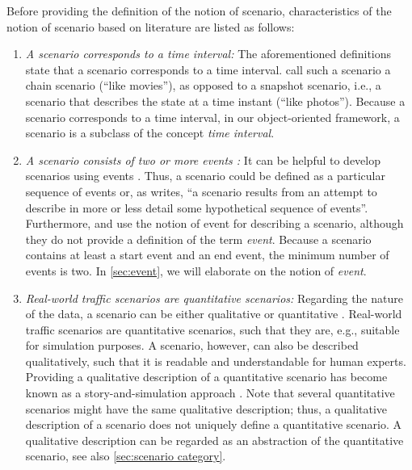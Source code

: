 Before providing the definition of the notion of scenario, characteristics of the notion of scenario based on literature are listed as follows:
%
\begin{enumerate}
	\item \textit{A scenario corresponds to a time interval:}
	The aforementioned definitions \autocite{go2004blind, geyer2014, ulbrich2015, elrofai2016scenario} state that a scenario corresponds to a time interval. \textcite{vannotten2003updated} call such a scenario a chain scenario (``like movies''), as opposed to a snapshot scenario, i.e., a scenario that describes the state at a time instant (``like photos''). %
	\cstartb Because a scenario corresponds to a time interval, in our object-oriented framework, a scenario is a subclass of the concept \emph{time interval}. \cendb

	\item \textit{A scenario consists of \cstartb two or more \cendb events \autocite{vannotten2003updated, go2004blind, geyer2014, ulbrich2015, kahn1962}:}
	It can be helpful to develop scenarios using events \autocite{bishop2007scentechniques}. Thus, a scenario could be defined as a particular sequence of events or, as \textcite[p.~143]{kahn1962} writes, ``a scenario results from an attempt to describe in more or less detail some hypothetical sequence of events''. Furthermore, \textcite{geyer2014} and \textcite{ulbrich2015} use the notion of event for describing a scenario, although they do not provide a definition of the term \emph{event}. 
	\cstartb Because a scenario contains at least a start event and an end event, the minimum number of events is two. \cendb
	In \cref{sec:event}, we will elaborate on the notion of \emph{event}.

	\item \textit{Real-world traffic scenarios are quantitative scenarios:}
	Regarding the nature of the data, a scenario can be either qualitative or quantitative \autocite{vannotten2003updated}. Real-world traffic scenarios are quantitative scenarios, such that they are, e.g., suitable for simulation purposes. A scenario, however, can also be described qualitatively, such that it is readable and understandable for human experts. Providing a qualitative description of a quantitative scenario has become known as a story-and-simulation approach \autocite{alcamo2001scenarios}. 
	Note that several quantitative scenarios might have the same qualitative description; thus, a qualitative description of a scenario does not uniquely define a quantitative scenario. A qualitative description can be regarded as an abstraction of the quantitative scenario, see also \cref{sec:scenario category}.


\end{enumerate}
